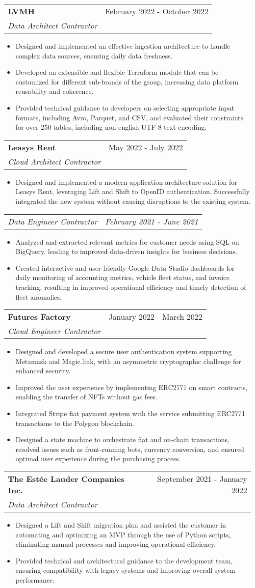 \documentclass[letterpaper,11pt]{article}
\makeatletter
\newcommand{\resumeItem}[1]{
  \item\small{#1 \vspace{-2pt}}
}
\newcommand{\resumeSubheading}[3]{
  \vspace{-1pt}\item
    \begin{tabular*}{0.97\textwidth}[t]{l@{\extracolsep{\fill}}r}
      \textbf{#1} & #2 \\
      \textit{\small #3} \\
    \end{tabular*}\vspace{-5pt}
}
\newcommand{\resumeSubSubheading}[2]{
  \begin{tabular*}{0.97\textwidth}{l@{\extracolsep{\fill}}r}
    \textit{\small#1} & \textit{\small #2} \\
  \end{tabular*}\vspace{-5pt}
}
\newcommand{\resumeItemListStart}{\begin{itemize}}
\newcommand{\resumeItemListEnd}{\end{itemize}\vspace{-5pt}}
\makeatother
\begin{document}
\resumeSubheading{LVMH}
{February 2022 - October 2022}
{Data Architect Contractor}
\resumeItemListStart{}
\resumeItem{
	Designed and implemented an effective ingestion architecture to handle complex
	data sources, ensuring daily data freshness.
}
\resumeItem{
	Developed an extensible and flexible Terraform module that can be customized for
	different sub-brands of the group, increasing data platform reusability and
	coherence.
}
\resumeItem{
	Provided technical guidance to developers on selecting appropriate input formats,
	including Avro, Parquet, and CSV, and evaluated their constraints for over 250
	tables, including non-english UTF-8 text encoding.
}
\resumeItemListEnd{}


\resumeSubheading{Leasys Rent}
{May 2022 - July 2022}
{Cloud Architect Contractor}
\resumeItemListStart{}
\resumeItem{
	Designed and implemented a modern application architecture solution for Leasys Rent,
	leveraging Lift and Shift to OpenID authentication. Successfully integrated the
	new system without causing disruptions to the existing system.
}
\resumeItemListEnd{}


\resumeSubSubheading{Data Engineer Contractor}
{February 2021 - June 2021}
\resumeItemListStart{}
\resumeItem{
	Analyzed and extracted relevant metrics for customer needs using SQL on
	BigQuery, leading to improved data-driven insights for business decisions.
}
\resumeItem{
	Created interactive and user-friendly Google Data Studio dashboards for daily
	monitoring of accounting metrics, vehicle fleet status, and invoice tracking,
	resulting in improved operational efficiency and timely detection of fleet
	anomalies.
}
\resumeItemListEnd{}


\resumeSubheading{Futures Factory}
{January 2022 - March 2022}
{Cloud Engineer Contractor}
\resumeItemListStart{}
\resumeItem{
	Designed and developed a secure user authentication system supporting Metamask
	and Magic.link, with an asymmetric cryptographic challenge for enhanced
	security.
}
\resumeItem{
	Improved the user experience by implementing ERC2771 on smart contracts,
	enabling the transfer of NFTs without gas fees.
}
\resumeItem{
	Integrated Stripe fiat payment system with the service submitting ERC2771
	transactions to the Polygon blockchain.
}
\resumeItem{
	Designed a state machine to orchestrate fiat and on-chain transactions, resolved
	issues such as front-running bots, currency conversion, and ensured optimal user
	experience during the purchasing process.
}
\resumeItemListEnd{}


\resumeSubheading{The Estée Lauder Companies Inc.}
{September 2021 - January 2022}
{Data Architect Contractor}
\resumeItemListStart{}
\resumeItem{
	Designed a Lift and Shift migration plan and assisted the customer in automating
	and optimizing an MVP through the use of Python scripts, eliminating manual
	processes and improving operational efficiency.
}
\resumeItem{
	Provided technical and architectural guidance to the development team, ensuring
	compatibility with legacy systems and improving overall system performance.
}
\resumeItemListEnd{}
\end{document}
